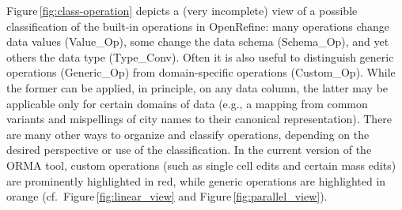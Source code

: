 \documentclass[conference]{ijdc-v14}
\newcommand{\Figref}[1]{Figure\,\ref{#1}}
\newcommand{\orma}{\textsf{ORMA}\xspace}  %
\newcommand{\openrefine}{\textrm{OpenRefine}\xspace}
\newcommand{\co}[1]{\textsf{\small{#1}}}
\begin{document}
\Figref{fig:class-operation} depicts a (very incomplete) view of a possible classification of the
built-in operations in \openrefine: many operations change data values (\co{Value\_Op}), some change
the data schema (\co{Schema\_Op}), and yet others the data type (\co{Type\_Conv}). Often it is also
useful to distinguish generic operations (\co{Generic\_Op}) from domain-specific operations
(\co{Custom\_Op}). While the former can be applied, in principle, on any data column, the latter may
be applicable only for certain domains of data (e.g., a mapping from common variants and mispellings
of city names to their canonical representation).  There are many other ways to organize and
classify operations, depending on the desired perspective or use of the classification. In the
current version of the \orma tool, custom operations (such as single cell edits and certain mass
edits) are prominently highlighted in red, while generic operations are highlighted in orange (cf.\
\Figref{fig:linear_view} and \Figref{fig:parallel_view}).



\end{document}
